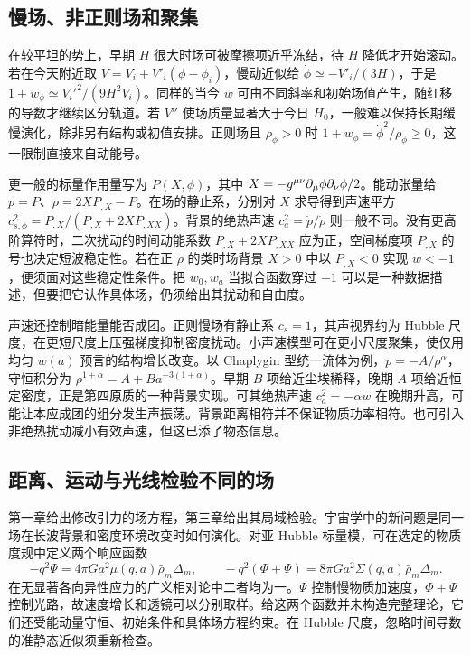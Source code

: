 \subsection{慢场、非正则场和聚集}

在较平坦的势上，早期 $H$ 很大时场可被摩擦项近乎冻结，待 $H$ 降低才开始滚动。若在今天附近取 $V=V_i+V'_i(\phi-\phi_i)$，慢动近似给 $\dot\phi\simeq-V'_i/(3H)$，于是 $1+w_\phi\simeq V_i'^2/(9H^2V_i)$。同样的当今 $w$ 可由不同斜率和初始场值产生，随红移的导数才继续区分轨道。若 $V''$ 使场质量显著大于今日 $H_0$，一般难以保持长期缓慢演化，除非另有结构或初值安排。正则场且 $\rho_\phi>0$ 时 $1+w_\phi=\dot\phi^2/\rho_\phi\geq0$，这一限制直接来自动能号。

更一般的标量作用量写为 $P(X,\phi)$，其中 $X=-g^{\mu\nu}\partial_\mu\phi\partial_\nu\phi/2$。能动张量给 $p=P$、$\rho=2XP_{,X}-P$。在场的静止系，分别对 $X$ 求导得到声速平方 $c_{s,\phi}^2=P_{,X}/(P_{,X}+2XP_{,XX})$。背景的绝热声速 $c_a^2=\dot p/\dot\rho$ 则一般不同。没有更高阶算符时，二次扰动的时间动能系数 $P_{,X}+2XP_{,XX}$ 应为正，空间梯度项 $P_{,X}$ 的号也决定短波稳定性。若在正 $\rho$ 的类时场背景 $X>0$ 中以 $P_{,X}<0$ 实现 $w<-1$，便须面对这些稳定性条件。把 $w_0,w_a$ 当拟合函数穿过 $-1$ 可以是一种数据描述，但要把它认作具体场，仍须给出其扰动和自由度。

声速还控制暗能量能否成团。正则慢场有静止系 $c_s=1$，其声视界约为 Hubble 尺度，在更短尺度上压强梯度抑制密度扰动。小声速模型可在更小尺度聚集，使仅用均匀 $w(a)$ 预言的结构增长改变。以 Chaplygin 型统一流体为例，$p=-A/\rho^\alpha$，守恒积分为 $\rho^{1+\alpha}=A+B a^{-3(1+\alpha)}$。早期 $B$ 项给近尘埃稀释，晚期 $A$ 项给近恒定密度，正是第四原质的一种背景实现。可其绝热声速 $c_a^2=-\alpha w$ 在晚期升高，可能让本应成团的组分发生声振荡。背景距离相符并不保证物质功率相符。也可引入非绝热扰动减小有效声速，但这已添了物态信息。

\subsection{距离、运动与光线检验不同的场}

第一章给出修改引力的场方程，第三章给出其局域检验。宇宙学中的新问题是同一场在长波背景和密度环境改变时如何演化。对亚 Hubble 标量模，可在选定的物质度规中定义两个响应函数
\[
 -q^2\Psi=4\pi G a^2\mu(q,a)\bar\rho_m\Delta_m,\qquad
 -q^2(\Phi+\Psi)=8\pi G a^2\Sigma(q,a)\bar\rho_m\Delta_m .
\]
在无显著各向异性应力的广义相对论中二者均为一。$\Psi$ 控制慢物质加速度，$\Phi+\Psi$ 控制光路，故速度增长和透镜可以分别取样。给这两个函数并未构造完整理论，它们还受能动量守恒、初始条件和具体场方程约束。在 Hubble 尺度，忽略时间导数的准静态近似须重新检查。

